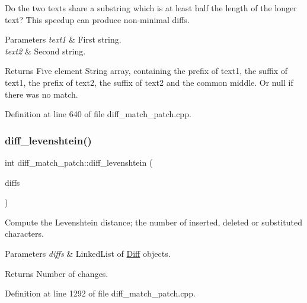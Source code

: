 Do the two texts share a substring which is at least half the length of the longer text? This speedup can produce non-\/minimal diffs. 
\begin{DoxyParams}{Parameters}
{\em text1} & First string. \\
\hline
{\em text2} & Second string. \\
\hline
\end{DoxyParams}
\begin{DoxyReturn}{Returns}
Five element String array, containing the prefix of text1, the suffix of text1, the prefix of text2, the suffix of text2 and the common middle. Or null if there was no match. 
\end{DoxyReturn}


Definition at line 640 of file diff\+\_\+match\+\_\+patch.\+cpp.

\mbox{\label{classdiff__match__patch_a5183e0300c4fbe6b993cae9844f57c11}} 
\subsubsection{\texorpdfstring{diff\+\_\+levenshtein()}{diff\_levenshtein()}}
{\footnotesize\ttfamily int diff\+\_\+match\+\_\+patch\+::diff\+\_\+levenshtein (\begin{DoxyParamCaption}\item[{const Q\+List$<$ \hyperlink{class_diff}{Diff} $>$ \&}]{diffs }\end{DoxyParamCaption})}

Compute the Levenshtein distance; the number of inserted, deleted or substituted characters. 
\begin{DoxyParams}{Parameters}
{\em diffs} & Linked\+List of \hyperlink{class_diff}{Diff} objects. \\
\hline
\end{DoxyParams}
\begin{DoxyReturn}{Returns}
Number of changes. 
\end{DoxyReturn}


Definition at line 1292 of file diff\+\_\+match\+\_\+patch.\+cpp.

\mbox{\label{classdiff__match__patch_ab1f120b83d49948767de531ab2a4e15a}} 
